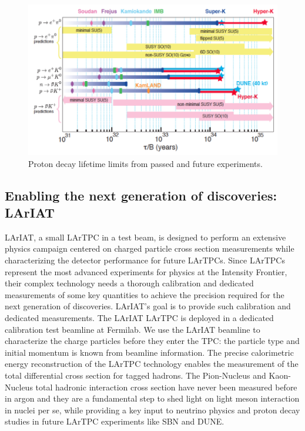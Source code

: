 \begin{figure}[hbpt]
\centering
\includegraphics[width=\textwidth]{Chapter-2/Images/PDKExperimentalLImit.png}
\caption{Proton decay lifetime limits from passed and future experiments.}
\label{fig:PDKExperimentalLImit}
\end{figure}


\subsection{Enabling the next generation of discoveries: LArIAT}
LArIAT, a small LArTPC in a test beam,  is designed to perform an extensive physics campaign centered on charged particle cross section measurements while characterizing the detector performance for future LArTPCs. Since LArTPCs represent the most advanced experiments for physics at the Intensity Frontier, their complex technology needs a thorough calibration and dedicated measurements of some key quantities to achieve the precision required for the next generation of discoveries.  LArIAT's goal is to provide such calibration and dedicated measurements. The LArIAT LArTPC is deployed in a dedicated calibration test beamline at Fermilab. We use the LArIAT beamline to characterize the charge particles before they enter the TPC: the particle type and initial momentum is known from beamline information. The precise calorimetric energy reconstruction of the LArTPC technology enables the measurement of the total differential cross section for  tagged hadrons. 
The Pion-Nucleus and Kaon-Nucleus total hadronic interaction cross section have never been measured before in argon and they are a fundamental step to shed light on light meson interaction in nuclei per se, while providing a key input to neutrino physics and proton decay studies in future LArTPC experiments like SBN and DUNE. 

